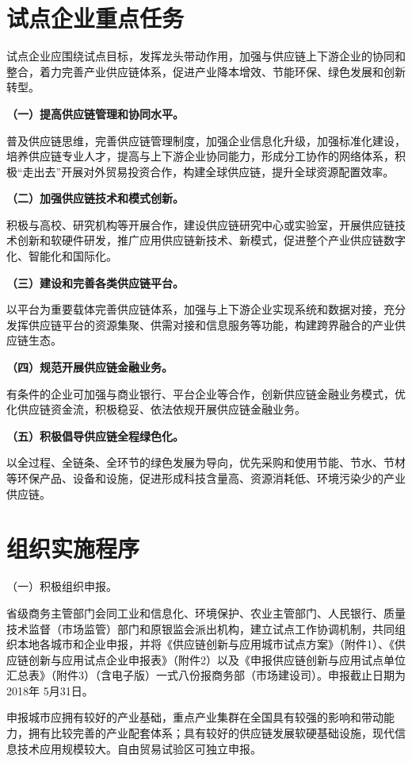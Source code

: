 \section{试点企业重点任务}

试点企业应围绕试点目标，发挥龙头带动作用，加强与供应链上下游企业的协同和整合，着力完善产业供应链体系，促进产业降本增效、节能环保、绿色发展和创新转型。

{ \bf （一）提高供应链管理和协同水平。 }

普及供应链思维，完善供应链管理制度，加强企业信息化升级，加强标准化建设，培养供应链专业人才，提高与上下游企业协同能力，形成分工协作的网络体系，积极“走出去”开展对外贸易投资合作，构建全球供应链，提升全球资源配置效率。

{ \bf （二）加强供应链技术和模式创新。 }

积极与高校、研究机构等开展合作，建设供应链研究中心或实验室，开展供应链技术创新和软硬件研发，推广应用供应链新技术、新模式，促进整个产业供应链数字化、智能化和国际化。

{ \bf （三）建设和完善各类供应链平台。 }

以平台为重要载体完善供应链体系，加强与上下游企业实现系统和数据对接，充分发挥供应链平台的资源集聚、供需对接和信息服务等功能，构建跨界融合的产业供应链生态。

{ \bf （四）规范开展供应链金融业务。 }

有条件的企业可加强与商业银行、平台企业等合作，创新供应链金融业务模式，优化供应链资金流，积极稳妥、依法依规开展供应链金融业务。

{ \bf （五）积极倡导供应链全程绿色化。 }

以全过程、全链条、全环节的绿色发展为导向，优先采购和使用节能、节水、节材等环保产品、设备和设施，促进形成科技含量高、资源消耗低、环境污染少的产业供应链。

\section{组织实施程序}

 （一）积极组织申报。

省级商务主管部门会同工业和信息化、环境保护、农业主管部门、人民银行、质量技术监督（市场监管）部门和原银监会派出机构，建立试点工作协调机制，共同组织本地各城市和企业申报，并将《供应链创新与应用城市试点方案》（附件1）、《供应链创新与应用试点企业申报表》（附件2）以及《申报供应链创新与应用试点单位汇总表》（附件3）（含电子版）一式八份报商务部（市场建设司）。申报截止日期为2018年 5月31日。

申报城市应拥有较好的产业基础，重点产业集群在全国具有较强的影响和带动能力，拥有比较完善的产业配套体系；具有较好的供应链发展软硬基础设施，现代信息技术应用规模较大。自由贸易试验区可独立申报。

